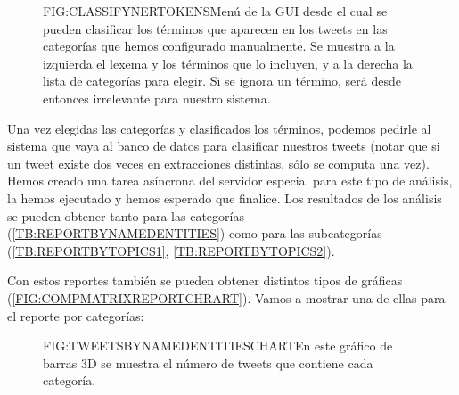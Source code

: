 \begin{figure}[Clasificando términos desde la GUI para entrenar el sistema.]{FIG:CLASSIFYNERTOKENS}{Menú de la GUI desde el cual se pueden clasificar los términos que aparecen en los tweets en las categorías que hemos configurado manualmente. Se muestra a la izquierda el lexema y los términos que lo incluyen, y a la derecha la lista de categorías para elegir. Si se ignora un término, será desde entonces irrelevante para nuestro sistema.}
\end{figure}
\newpage
Una vez elegidas las categorías y clasificados los términos, podemos pedirle al sistema que vaya al banco de datos para clasificar nuestros tweets (notar que si un tweet existe dos veces en extracciones distintas, sólo se computa una vez). Hemos creado una tarea asíncrona del servidor especial para este tipo de análisis, la hemos ejecutado y hemos esperado que finalice. Los resultados de los análisis se pueden obtener tanto para las categorías (\ref{TB:REPORTBYNAMEDENTITIES}) como para las subcategorías (\ref{TB:REPORTBYTOPICS1}, \ref{TB:REPORTBYTOPICS2}). 

Con estos reportes también se pueden obtener distintos tipos de gráficas (\ref{FIG:COMPMATRIXREPORTCHRART}). Vamos a mostrar una de ellas para el reporte por categorías:

 \begin{figure}[Gráfico de barras 3D que muestra los tweets por cateoría]{FIG:TWEETSBYNAMEDENTITIESCHART}{En este gráfico de barras 3D se muestra el número de tweets que contiene cada categoría.}
\end{figure}

